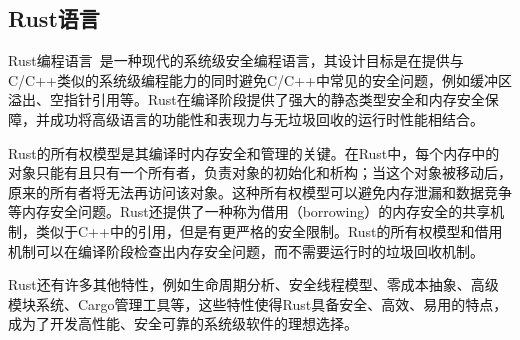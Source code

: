 \subsection{Rust语言}

Rust编程语言~\cite{}是一种现代的系统级安全编程语言，其设计目标是在提供与C/C++类似的系统级编程能力的同时避免C/C++中常见的安全问题，例如缓冲区溢出、空指针引用等。Rust在编译阶段提供了强大的静态类型安全和内存安全保障，并成功将高级语言的功能性和表现力与无垃圾回收的运行时性能相结合。

Rust的所有权模型是其编译时内存安全和管理的关键。在Rust中，每个内存中的对象只能有且只有一个所有者，负责对象的初始化和析构；当这个对象被移动后，原来的所有者将无法再访问该对象。这种所有权模型可以避免内存泄漏和数据竞争等内存安全问题。Rust还提供了一种称为借用（borrowing）的内存安全的共享机制，类似于C++中的引用，但是有更严格的安全限制。Rust的所有权模型和借用机制可以在编译阶段检查出内存安全问题，而不需要运行时的垃圾回收机制。

Rust还有许多其他特性，例如生命周期分析、安全线程模型、零成本抽象、高级模块系统、Cargo管理工具等，这些特性使得Rust具备安全、高效、易用的特点，成为了开发高性能、安全可靠的系统级软件的理想选择。
